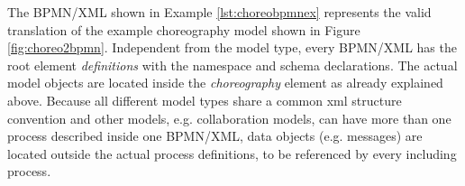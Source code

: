 The BPMN/XML shown in Example \ref{lst:choreobpmnex} represents the valid translation of the example choreography model shown in Figure \ref{fig:choreo2bpmn}. Independent from the model type, every BPMN/XML has the root element \textit{definitions} with the namespace and schema declarations. The actual model objects are located inside the \textit{choreography} element as already explained above. Because all different model types share a common xml structure convention and other models, e.g. collaboration models, can have more than one process described inside one BPMN/XML, data objects (e.g. messages) are located outside the actual process definitions, to be referenced by every including process. \\


